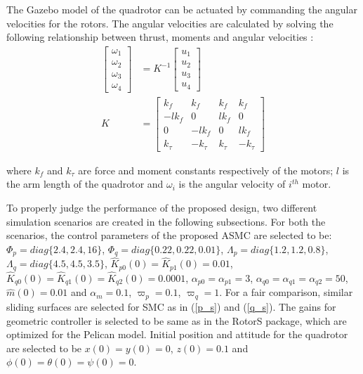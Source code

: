 The Gazebo model of the quadrotor can be actuated by commanding the angular velocities for the rotors. The angular velocities are calculated by solving the following relationship between thrust, moments and angular velocities \cite{mellinger2011minimum}:
    \begin{align}
        \begin{bmatrix}
            \omega_1\\ \omega_2 \\ \omega_3 \\ \omega_4
        \end{bmatrix} &= 
        K^{-1} 
        \begin{bmatrix}
            u_1 \\ u_2 \\ u_3 \\ u_4
        \end{bmatrix} \\
        K &= \begin{bmatrix}
            k_f & k_f & k_f & k_f\\ -l k_f & 0 & l k_f & 0 \\ 0 & -l k_f & 0 & l k_f \\ k_{\tau} & -k_{\tau} & k_{\tau} & -k_{\tau} 
        \end{bmatrix}
    \end{align}
    
where $k_f$ and $k_{\tau}$ are force and moment constants respectively of the motors; $l$ is the arm length of the quadrotor and $\omega_i$ is the angular velocity of $i^{th}$ motor.

To properly judge the performance of the proposed design, two different simulation scenarios are created in the following subsections. For both the scenarios, the control parameters of the proposed ASMC are selected to be:
$\Phi_p = diag \lbrace
    2.4, 2.4, 16 \rbrace$, $\Phi_q = diag \lbrace
    0.22 , 0.22 , 0.01 \rbrace$, $\Lambda_p = diag \lbrace
    1.2 , 1.2 , 0.8 \rbrace$, $\Lambda_q = diag \lbrace 
    4.5 , 4.5 , 3.5 \rbrace$, $\hat{K}_{p0}(0) = \hat{K}_{p1}(0) = 0.01$, $\hat{K}_{q0}(0) = \hat{K}_{q1}(0) = \hat{K}_{q2}(0) = 0.0001$, $\alpha_{p0} = \alpha_{p1} = 3$, $\alpha_{q0} = \alpha_{q1} = \alpha_{q2} = 50$, $\hat{m}(0) = 0.01$ and $\alpha_m = 0.1$, $\varpi_p=0.1$, $\varpi_q=1$. For a fair comparison, similar sliding surfaces are selected for SMC as in (\ref{p_s}) and (\ref{q_s}). The gains for geometric controller \cite{lee2010geometric} is selected to be same as in the RotorS package, which are optimized for the Pelican model. Initial position and attitude for the quadrotor are selected to be $x(0)=y(0)=0$, $z(0)=0.1$ and $\phi(0)=\theta(0)=\psi(0)=0$.

